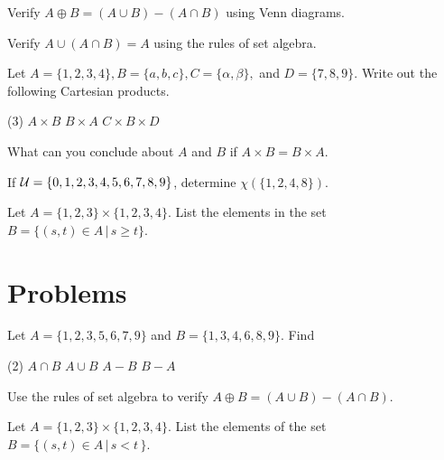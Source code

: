 \begin{exer}
Verify $A \oplus B = (A\cup B) - (A \cap B)$ using Venn diagrams.
\end{exer}

\begin{exer}
Verify $A\cup(A\cap B) = A$ using the rules of set algebra.
\end{exer}

\begin{exer}
Let $A=\{1,2,3,4\}, B=\{a, b, c\}, C=\{\alpha, \beta\}, $ and $D=\{7,8,9\}$.
Write out the following Cartesian products.
\begin{tasks}(3)
	\task $A\times B$
	\task $B\times A$
	\task $C\times B\times D$
\end{tasks}
\end{exer}

\begin{exer}
What can you conclude about $A$ and $B$ if $A\times B = B\times A$.
\end{exer}

\begin{exer}
If ${\cal {U}}=\{0,1,2,3,4,5,6,7,8,9\}$, determine $\chi(\{1,2,4,8\})$.
\end{exer}

\begin{exer}
Let $A = \{1,2,3\}\times\{1,2,3,4\}$. List the elements in the set $B = \{(s,t)\in A\,|\, s\geq t\}$.
\end{exer}


\clearpage
\section{Problems}

\begin{prob}
Let $A=\{1,2,3,5,6,7,9\}$ and $B=\{1,3,4,6,8,9\}$. Find 
\begin{tasks}(2)
\task $A\cap B$
\task $A\cup B$
\task $A-B$
\task $B-A$\\[5pt]
\end{tasks}
\end{prob}

\begin{prob}
Use the rules of set algebra to verify $A\oplus B=(A\cup B)-(A\cap B)$.
\end{prob}


\begin{prob}
Let $A=\{1,2,3\}\times\{1,2,3,4\}$. List the elements of the set
$B= \{ (s,t)\in A\,|\, s< t\,\}$. 
\end{prob}

